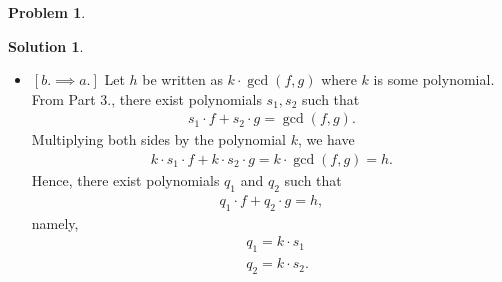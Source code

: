 \documentclass{book}
\theoremstyle{definition}
\newtheorem*{prob*}{Problem}
\newtheorem*{sln*}{Solution}
\begin{document}
\begin{prob*}
\begin{sln*}
\begin{enumerate}
\begin{itemize}
		\item $[b.\implies a.]$ Let $h$ be written as $k\cdot \gcd(f,g)$ where $k$ is some polynomial. From Part 3., there exist polynomials $s_1, s_2$ such that
		\begin{align*}
		s_1 \cdot f + s_2 \cdot g = \gcd(f,g).
		\end{align*}
		Multiplying both sides by the polynomial $k$, we have
		\begin{align*}
		k\cdot s_1 \cdot f + k \cdot s_2 \cdot g = k\cdot \gcd(f,g) = h.
		\end{align*}
		Hence, there exist polynomials $q_1$ and $q_2$ such that 
		\begin{align*}
		q_1 \cdot f + q_2 \cdot g = h,
		\end{align*}
		namely, 
		\begin{align*}
		&q_1 = k \cdot s_1\\
		&q_2 = k \cdot s_2.
		\end{align*}
	\end{itemize}


\end{enumerate}
\end{sln*}
\end{prob*}


\newpage
\end{document}
